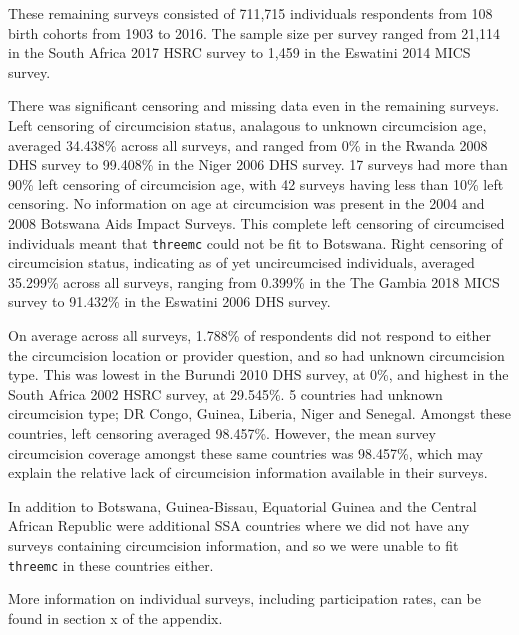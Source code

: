\documentclass{article}
\begin{document}
These remaining surveys consisted of 711,715 individuals respondents from 108 birth cohorts from 1903 to 2016. The sample size per survey ranged from 21,114 in the South Africa 2017 HSRC survey to 1,459 in the Eswatini 2014 MICS survey.

There was significant censoring and missing data even in the remaining surveys. 
Left censoring of circumcision status, analagous to unknown circumcision age, averaged  34.438\% across all surveys, and ranged from 0\% in the Rwanda 2008 DHS survey to 99.408\% in the Niger 2006 DHS survey.
17 surveys had more than 90\% left censoring of circumcision age, with 42 surveys having less than 10\% left censoring.
No information on age at circumcision was present in the 2004 and 2008 Botswana Aids Impact Surveys. This complete left censoring of circumcised individuals meant that \verb|threemc| could not be fit to Botswana. 
Right censoring of circumcision status, indicating as of yet uncircumcised individuals, averaged 35.299\% across all surveys, ranging from 0.399\% in the The Gambia 2018 MICS survey to 91.432\% in the Eswatini 2006 DHS survey.

On average across all surveys, 1.788\% of respondents did not respond to either the circumcision location or provider question, and so had unknown circumcision type. 
This was lowest in the Burundi 2010 DHS survey, at 0\%, and highest in the South Africa 2002 HSRC survey, at 29.545\%.
5 countries had unknown circumcision type; DR Congo, Guinea, Liberia, Niger and Senegal. 
Amongst these countries, left censoring averaged 98.457\%. 
However, the mean survey circumcision coverage amongst these same countries was 98.457\%, which may explain the relative lack of circumcision information available in their surveys.

In addition to Botswana, Guinea-Bissau, Equatorial Guinea and the Central African Republic were additional SSA countries where we did not have any surveys containing circumcision information, and so we were unable to fit \verb|threemc| in these countries either. 

More information on individual surveys, including participation rates, can be found in section x of the appendix. 
\end{document}
